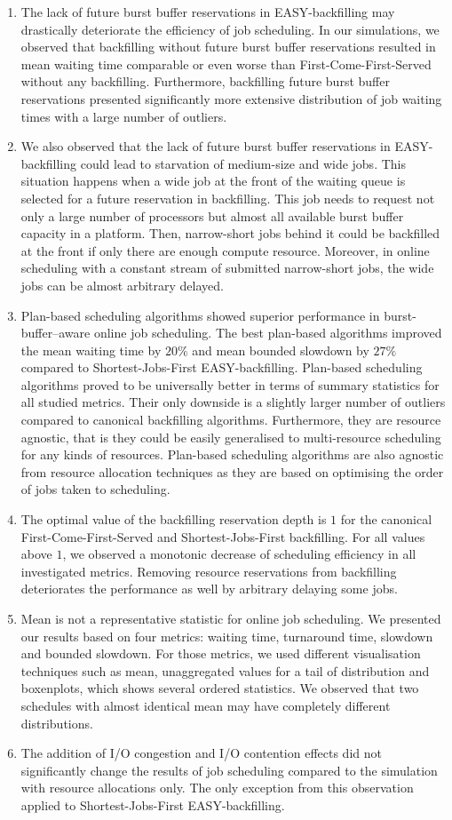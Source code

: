 \documentclass[thesis-en.tex]{subfiles}
\begin{document}
\begin{enumerate}
    \item The lack of future burst buffer reservations in EASY-backfilling may drastically deteriorate the efficiency of job scheduling. In our simulations, we observed that backfilling without future burst buffer reservations resulted in mean waiting time comparable or even worse than First-Come-First-Served without any backfilling. Furthermore, backfilling future burst buffer reservations presented significantly more extensive distribution of job waiting times with a large number of outliers.
    \item We also observed that the lack of future burst buffer reservations in EASY-backfilling could lead to starvation of medium-size and wide jobs. This situation happens when a wide job at the front of the waiting queue is selected for a future reservation in backfilling. This job needs to request not only a large number of processors but almost all available burst buffer capacity in a platform. Then, narrow-short jobs behind it could be backfilled at the front if only there are enough compute resource. Moreover, in online scheduling with a constant stream of submitted narrow-short jobs, the wide jobs can be almost arbitrary delayed.
    \item Plan-based scheduling algorithms showed superior performance in burst-buffer--aware online job scheduling. The best plan-based algorithms improved the mean waiting time by $20\%$ and mean bounded slowdown by $27\%$ compared to Shortest-Jobs-First EASY-backfilling. Plan-based scheduling algorithms proved to be universally better in terms of summary statistics for all studied metrics. Their only downside is a slightly larger number of outliers compared to canonical backfilling algorithms. Furthermore, they are resource agnostic, that is they could be easily generalised to multi-resource scheduling for any kinds of resources. Plan-based scheduling algorithms are also agnostic from resource allocation techniques as they are based on optimising the order of jobs taken to scheduling.
    \item The optimal value of the backfilling reservation depth is $1$ for the canonical First-Come-First-Served and Shortest-Jobs-First backfilling. For all values above $1$, we observed a monotonic decrease of scheduling efficiency in all investigated metrics. Removing resource reservations from backfilling deteriorates the performance as well by arbitrary delaying some jobs.
    \item Mean is not a representative statistic for online job scheduling. We presented our results based on four metrics: waiting time, turnaround time, slowdown and bounded slowdown. For those metrics, we used different visualisation techniques such as mean, unaggregated values for a tail of distribution and boxenplots, which shows several ordered statistics. We observed that two schedules with almost identical mean may have completely different distributions.
    \item The addition of I/O congestion and I/O contention effects did not significantly change the results of job scheduling compared to the simulation with resource allocations only. The only exception from this observation applied to Shortest-Jobs-First EASY-backfilling.
\end{enumerate}
\end{document}
